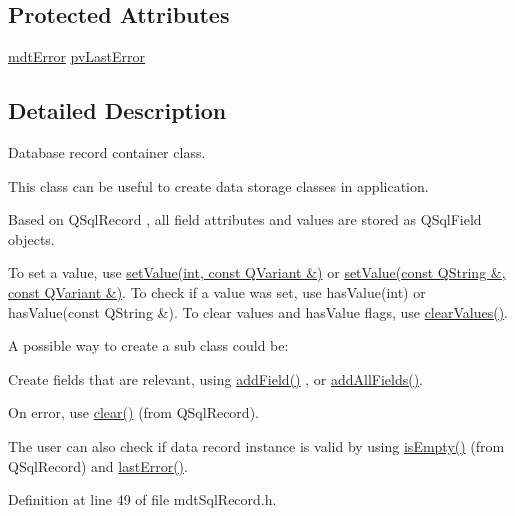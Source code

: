 \subsection*{Protected Attributes}
\begin{DoxyCompactItemize}
\item 
\hyperlink{classmdt_error}{mdt\-Error} \hyperlink{classmdt_sql_record_ae320a7933f4d5a002efc509c4c9c5a12}{pv\-Last\-Error}
\end{DoxyCompactItemize}


\subsection{Detailed Description}
Database record container class. 

This class can be useful to create data storage classes in application.

Based on Q\-Sql\-Record , all field attributes and values are stored as Q\-Sql\-Field objects.

To set a value, use \hyperlink{classmdt_sql_record_a330291ff82fb8c7803c47d30f8939ed5}{set\-Value(int, const Q\-Variant \&)} or \hyperlink{classmdt_sql_record_a8bcaf65b449b6c82548735cdccb8cff1}{set\-Value(const Q\-String \&, const Q\-Variant \&)}. To check if a value was set, use has\-Value(int) or has\-Value(const Q\-String \&). To clear values and has\-Value flags, use \hyperlink{classmdt_sql_record_a0bfc0fc265c6b0048698e2f5d4f840a8}{clear\-Values()}.

A possible way to create a sub class could be\-:
\begin{DoxyItemize}
\item Create fields that are relevant, using \hyperlink{classmdt_sql_record_a7b144e9c00e46748e1729251aabd5f51}{add\-Field()} , or \hyperlink{classmdt_sql_record_a878c551b98df2653d642ec01b0101495}{add\-All\-Fields()}.
\item On error, use \hyperlink{classmdt_sql_record_ad1058337837b2891d2e282001ad889d9}{clear()} (from Q\-Sql\-Record).
\item The user can also check if data record instance is valid by using \hyperlink{classmdt_sql_record_a2d4e5e0834b9f1c884a117d89a5df31a}{is\-Empty()} (from Q\-Sql\-Record) and \hyperlink{classmdt_sql_record_aa997bbc32402c3a254404ab74b9662f0}{last\-Error()}. 
\end{DoxyItemize}

Definition at line 49 of file mdt\-Sql\-Record.\-h.



